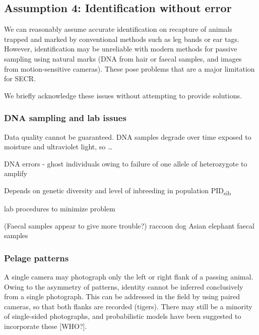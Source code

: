 \documentclass[
]{book}
\begin{document}
\subsection{Assumption 4: Identification without error}\label{assumption-4-identification-without-error}

We can reasonably assume accurate identification on recapture of animals trapped and marked by conventional methods such as leg bands or ear tags. However, identification may be unreliable with modern methods for passive sampling using natural marks (DNA from hair or faecal samples, and images from motion-sensitive cameras). These pose problems that are a major limitation for SECR.

We briefly acknowledge these issues without attempting to provide solutions.

\subsubsection{DNA sampling and lab issues}\label{dna-sampling-and-lab-issues}

Data quality cannot be guaranteed. DNA samples degrade over time exposed to moisture and ultraviolet light, so \ldots{} \citep[references in][ etc. papers]{Lukacs2005}

DNA errors - ghost individuals owing to failure of one allele of heterozygote to amplify

Depends on genetic diversity and level of inbreeding in population PID\textsubscript{sib}

\citep[ suggested modelling decline in DNA amplification success with duration of interval and environmental conditions, but that belongs elsewhere]{ebm13}

\citet{Paetkau2003} lab procedures to minimize problem

(Faecal samples appear to give more trouble?)
\citet{Kubo2023} raccoon dog
\citet{De2022} Asian elephant faecal samples

\citet{Woodruff2014}

\subsubsection{Pelage patterns}\label{pelage-patterns}

A single camera may photograph only the left or right flank of a passing animal. Owing to the asymmetry of patterns, identity cannot be inferred conclusively from a single photograph. This can be addressed in the field by using paired cameras, so that both flanks are recorded (tigers). There may still be a minority of single-sided photographs, and probabilistic models have been suggested to incorporate these {[}WHO?{]}.
\end{document}
